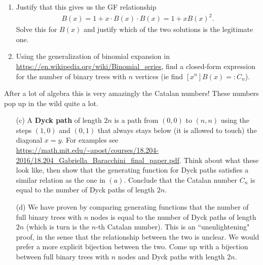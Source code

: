 \documentclass{article}
\theoremstyle{remark}
\begin{document}
\begin{enumerate}
    \begin{enumerate}
        \item Justify that this gives us the GF relationship
        \begin{align*}
            B(x) = 1 + x \cdot B(x) \cdot B(x) = 1 + xB(x)^2.
        \end{align*}
        Solve this for $B(x)$ and justify which of the two solutions is the legitimate one.
        \item Using the generalization of binomial expansion in \url{https://en.wikipedia.org/wiki/Binomial_series}, find a closed-form expression for the number of binary trees with $n$ vertices (ie find $[x^n]B(x) =: C_n$).
    \end{enumerate}
    After a lot of algebra this is very amazingly the Catalan numbers! These numbers pop up in the wild quite a lot.
    \begin{enumerate}
        \item[(c)] A \textbf{Dyck path} of length $2n$ is a path from $(0,0)$ to $(n,n)$ using the steps $(1,0)$ and $(0,1)$ that always stays below (it is allowed to touch) the diagonal $x=y$. For examples see \url{https://math.mit.edu/~apost/courses/18.204-2016/18.204_Gabriella_Baracchini_final_paper.pdf}. Think about what these look like, then show that the generating function for Dyck paths satisfies a similar relation as the one in $(a)$. Conclude that the Catalan number $C_n$ is equal to the number of Dyck paths of length $2n$.
        \item[(d)] We have proven by comparing generating functions that the number of full binary trees with $n$ nodes is equal to the number of Dyck paths of length $2n$ (which is turn is the $n$-th Catalan number). This is an ``unenlightening" proof, in the sense that the relationship between the two is unclear. We would prefer a more explicit bijection between the two. Come up with a bijection between full binary trees with $n$ nodes and Dyck paths with length $2n$.
    \end{enumerate}
    

\end{enumerate}
\end{document}

